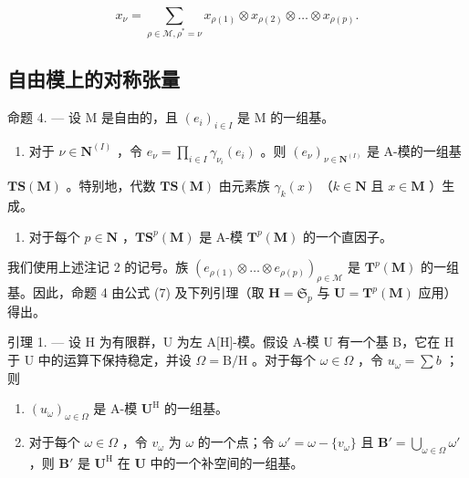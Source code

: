 \[
x _ {\nu} = \sum_ {\rho \in \mathcal {M}, \rho^ {*} = \nu} x _ {\rho (1)} \otimes x _ {\rho (2)} \otimes \dots \otimes x _ {\rho (p)}.\tag{7}
\]

\subsection{自由模上的对称张量}

命题 4. --- 设 M 是自由的，且 \((e_{i})_{i\in I}\) 是 M 的一组基。

\begin{enumerate}
\def\labelenumi{(\roman{enumi})}
\tightlist
\item
  对于 \(\nu \in \mathbf{N}^{(I)}\) ，令 \(e_{\nu} = \prod_{i\in I}\gamma_{\nu_i}(e_i)\) 。则 \((e_{\nu})_{\nu \in \mathbf{N}^{(I)}}\) 是 A-模的一组基
\end{enumerate}

\(\mathbf{TS}(\mathbf{M})\) 。特别地，代数 \(\mathbf{TS}(\mathbf{M})\) 由元素族 \(\gamma_k(x)\) （\(k \in \mathbf{N}\) 且 \(x \in \mathbf{M}\) ）生成。

\begin{enumerate}
\def\labelenumi{(\roman{enumi})}
\setcounter{enumi}{1}
\tightlist
\item
  对于每个 \(p \in \mathbf{N}\) ，\(\mathbf{T}\mathbf{S}^p(\mathbf{M})\) 是 A-模 \(\mathbf{T}^p(\mathbf{M})\) 的一个直因子。
\end{enumerate}

我们使用上述注记 2 的记号。族 \((e_{\rho(1)} \otimes \ldots \otimes e_{\rho(p)})_{\rho \in \mathcal{M}}\) 是 \(\mathbf{T}^p(\mathbf{M})\) 的一组基。因此，命题 4 由公式 (7) 及下列引理（取 \(\mathbf{H} = \mathfrak{S}_p\) 与 \(\mathbf{U} = \mathbf{T}^p(\mathbf{M})\) 应用）得出。

引理 1. --- 设 H 为有限群，U 为左 A{[}H{]}-模。假设 A-模 U 有一个基 B，它在 H 于 U 中的运算下保持稳定，并设 \(\Omega = \mathrm{B} / \mathrm{H}\) 。对于每个 \(\omega \in \Omega\) ，令 \(u_{\omega} = \sum b\) ；则

\begin{enumerate}
\def\labelenumi{(\roman{enumi})}
\item
  \((u_{\omega})_{\omega \in \Omega}\) 是 A-模 \(\mathbf{U}^{\mathrm{H}}\) 的一组基。
\item
  对于每个 \(\omega \in \Omega\) ，令 \(v_{\omega}\) 为 \(\omega\) 的一个点；令 \(\omega' = \omega - \{v_{\omega}\}\) 且 \(\mathbf{B}' = \bigcup_{\omega \in \Omega} \omega'\) ，则 \(\mathbf{B}'\) 是 \(\mathbf{U}^{\mathrm{H}}\) 在 \(\mathbf{U}\) 中的一个补空间的一组基。
\end{enumerate}

